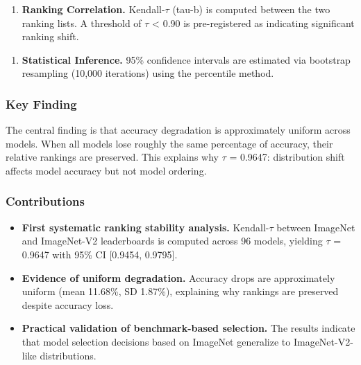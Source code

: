 \begin{enumerate}
\item \textbf{Ranking Correlation.} Kendall-$\tau$ (tau-b) is computed between the two ranking lists. A threshold of $\tau$ < 0.90 is pre-registered as indicating significant ranking shift.
\end{enumerate}

\begin{enumerate}
\item \textbf{Statistical Inference.} 95\% confidence intervals are estimated via bootstrap resampling (10,000 iterations) using the percentile method.
\end{enumerate}

\subsubsection{Key Finding}

The central finding is that accuracy degradation is approximately uniform across models. When all models lose roughly the same percentage of accuracy, their relative rankings are preserved. This explains why $\tau$ = 0.9647: distribution shift affects model accuracy but not model ordering.

\subsubsection{Contributions}

\begin{itemize}
\item \textbf{First systematic ranking stability analysis.} Kendall-$\tau$ between ImageNet and ImageNet-V2 leaderboards is computed across 96 models, yielding $\tau$ = 0.9647 with 95\% CI [0.9454, 0.9795].
\end{itemize}

\begin{itemize}
\item \textbf{Evidence of uniform degradation.} Accuracy drops are approximately uniform (mean 11.68\%, SD 1.87\%), explaining why rankings are preserved despite accuracy loss.
\end{itemize}

\begin{itemize}
\item \textbf{Practical validation of benchmark-based selection.} The results indicate that model selection decisions based on ImageNet generalize to ImageNet-V2-like distributions.
\end{itemize}

